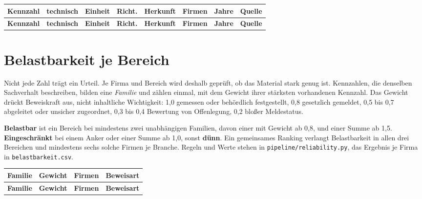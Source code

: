 \documentclass[11pt,a4paper]{article}
\begin{document}
\begin{center}\footnotesize
\begin{longtable}{P{3.2cm} P{3.5cm} P{2.2cm} c P{1.6cm} r c P{2.4cm}}
\toprule
\textbf{Kennzahl} & \textbf{technisch} & \textbf{Einheit} & \textbf{Richt.} & \textbf{Herkunft} & \textbf{Firmen} & \textbf{Jahre} & \textbf{Quelle} \\
\midrule
\endfirsthead
\toprule
\textbf{Kennzahl} & \textbf{technisch} & \textbf{Einheit} & \textbf{Richt.} & \textbf{Herkunft} & \textbf{Firmen} & \textbf{Jahre} & \textbf{Quelle} \\
\midrule
\endhead

\end{longtable}
\end{center}

\section{Belastbarkeit je Bereich}

Nicht jede Zahl trägt ein Urteil. Je Firma und Bereich wird deshalb geprüft, ob das Material stark genug ist. Kennzahlen, die denselben Sachverhalt beschreiben, bilden eine \emph{Familie} und zählen einmal, mit dem Gewicht ihrer stärksten vorhandenen Kennzahl. Das Gewicht drückt Beweiskraft aus, nicht inhaltliche Wichtigkeit: 1{,}0 gemessen oder behördlich festgestellt, 0{,}8 gesetzlich gemeldet, 0{,}5 bis 0{,}7 abgeleitet oder unsicher zugeordnet, 0{,}3 bis 0{,}4 Bewertung von Offenlegung, 0{,}2 bloßer Meldestatus.

\textbf{Belastbar} ist ein Bereich bei mindestens zwei unabhängigen Familien, davon einer mit Gewicht ab 0{,}8, und einer Summe ab 1{,}5. \textbf{Eingeschränkt} bei einem Anker oder einer Summe ab 1{,}0, sonst \textbf{dünn}. Ein gemeinsames Ranking verlangt Belastbarkeit in allen drei Bereichen und mindestens sechs solche Firmen je Branche. Regeln und Werte stehen in \texttt{pipeline/reliability.py}, das Ergebnis je Firma in \texttt{belastbarkeit.csv}.

\begin{center}\footnotesize
\begin{longtable}{P{4.6cm} c r P{8.6cm}}
\toprule
\textbf{Familie} & \textbf{Gewicht} & \textbf{Firmen} & \textbf{Beweisart} \\
\midrule
\endfirsthead
\toprule
\textbf{Familie} & \textbf{Gewicht} & \textbf{Firmen} & \textbf{Beweisart} \\
\midrule
\endhead

\end{longtable}
\end{center}
\end{document}
